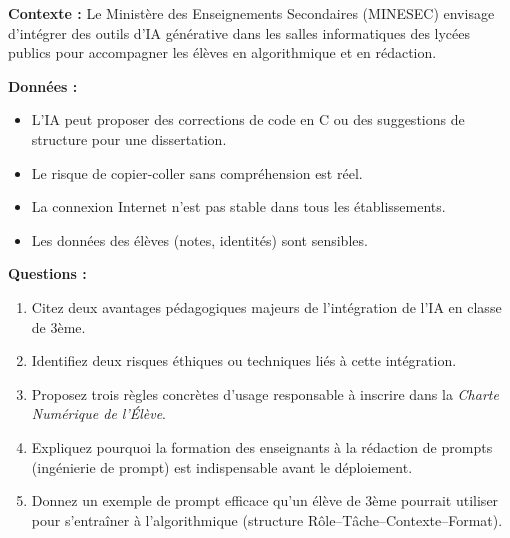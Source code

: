 \documentclass[11pt]{article}
\begin{document}
\begin{exercice}
\textbf{Contexte :} Le Ministère des Enseignements Secondaires (MINESEC) envisage d'intégrer des outils d'IA générative dans les salles informatiques des lycées publics pour accompagner les élèves en algorithmique et en rédaction.

\textbf{Données :}
\begin{itemize}
    \item L'IA peut proposer des corrections de code en C ou des suggestions de structure pour une dissertation.
    \item Le risque de copier-coller sans compréhension est réel.
    \item La connexion Internet n'est pas stable dans tous les établissements.
    \item Les données des élèves (notes, identités) sont sensibles.
\end{itemize}

\textbf{Questions :}
\begin{enumerate}
    \item Citez deux avantages pédagogiques majeurs de l'intégration de l'IA en classe de 3ème.
    \item Identifiez deux risques éthiques ou techniques liés à cette intégration.
    \item Proposez trois règles concrètes d'usage responsable à inscrire dans la \emph{Charte Numérique de l'Élève}.
    \item Expliquez pourquoi la formation des enseignants à la rédaction de prompts (ingénierie de prompt) est indispensable avant le déploiement.
    \item Donnez un exemple de prompt efficace qu'un élève de 3ème pourrait utiliser pour s'entraîner à l'algorithmique (structure Rôle–Tâche–Contexte–Format).
\end{enumerate}
\end{exercice}
\end{document}
